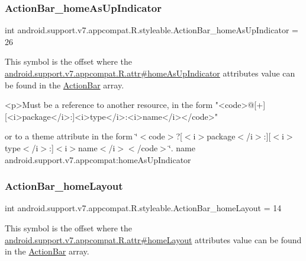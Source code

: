 \subsubsection{\texorpdfstring{Action\+Bar\+\_\+home\+As\+Up\+Indicator}{ActionBar\_homeAsUpIndicator}}
{\footnotesize\ttfamily int android.\+support.\+v7.\+appcompat.\+R.\+styleable.\+Action\+Bar\+\_\+home\+As\+Up\+Indicator = 26\hspace{0.3cm}{\ttfamily [static]}}

This symbol is the offset where the \hyperlink{classandroid_1_1support_1_1v7_1_1appcompat_1_1R_1_1attr_a2d0278177bbbefbfdf59fa9761e5b439}{android.\+support.\+v7.\+appcompat.\+R.\+attr\#home\+As\+Up\+Indicator} attribute\textquotesingle{}s value can be found in the \hyperlink{classandroid_1_1support_1_1v7_1_1appcompat_1_1R_1_1styleable_a5941dc15714398e9ec9afaa0155cc1cf}{Action\+Bar} array.

\begin{DoxyVerb}      <p>Must be a reference to another resource, in the form "<code>@[+][<i>package</i>:]<i>type</i>:<i>name</i></code>"
\end{DoxyVerb}
 or to a theme attribute in the form \char`\"{}$<$code$>$?\mbox{[}$<$i$>$package$<$/i$>$\+:\mbox{]}\mbox{[}$<$i$>$type$<$/i$>$\+:\mbox{]}$<$i$>$name$<$/i$>$$<$/code$>$\char`\"{}.  name android.\+support.\+v7.\+appcompat\+:home\+As\+Up\+Indicator \mbox{\label{classandroid_1_1support_1_1v7_1_1appcompat_1_1R_1_1styleable_a0775c0044a13b8aa06224d0a00977810}} 
\subsubsection{\texorpdfstring{Action\+Bar\+\_\+home\+Layout}{ActionBar\_homeLayout}}
{\footnotesize\ttfamily int android.\+support.\+v7.\+appcompat.\+R.\+styleable.\+Action\+Bar\+\_\+home\+Layout = 14\hspace{0.3cm}{\ttfamily [static]}}

This symbol is the offset where the \hyperlink{classandroid_1_1support_1_1v7_1_1appcompat_1_1R_1_1attr_a37c5ccbcfaf034e696f6cde6b0021747}{android.\+support.\+v7.\+appcompat.\+R.\+attr\#home\+Layout} attribute\textquotesingle{}s value can be found in the \hyperlink{classandroid_1_1support_1_1v7_1_1appcompat_1_1R_1_1styleable_a5941dc15714398e9ec9afaa0155cc1cf}{Action\+Bar} array.

